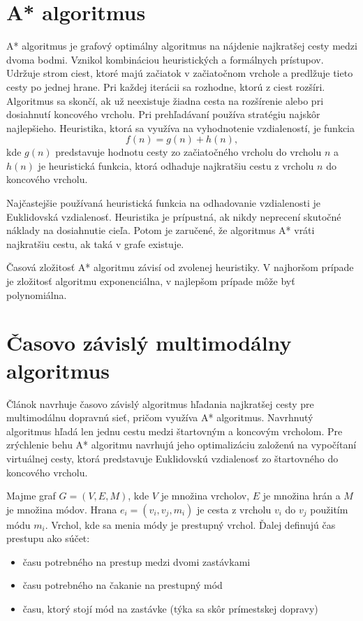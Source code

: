 \section{A* algoritmus}
A* algoritmus je grafový optimálny algoritmus na nájdenie najkratšej cesty medzi dvoma bodmi. Vznikol kombináciou heuristických a formálnych prístupov. Udržuje strom ciest, ktoré majú začiatok v začiatočnom vrchole a predlžuje tieto cesty po jednej hrane. Pri každej iterácii sa rozhodne, ktorú z ciest rozšíri. Algoritmus sa skončí, ak už neexistuje žiadna cesta na rozšírenie alebo pri dosiahnutí koncového vrcholu. Pri prehľadávaní používa stratégiu najskôr najlepšieho. Heuristika, ktorá sa využíva na vyhodnotenie vzdialeností, je funkcia
\begin{equation}
f(n) = g(n) + h(n), 
\end{equation}
kde $g(n)$ predstavuje hodnotu cesty zo začiatočného vrcholu do vrcholu $n$ a $h(n)$ je heuristická funkcia, ktorá odhaduje najkratšiu cestu z vrcholu $n$ do koncového vrcholu.

Najčastejšie používaná heuristická funkcia na odhadovanie vzdialenosti je Euklidovská vzdialenosť.
Heuristika je prípustná, ak nikdy neprecení skutočné náklady na dosiahnutie cieľa. Potom je zaručené, že algoritmus A* vráti najkratšiu cestu, ak taká v grafe existuje.

Časová zložitosť A* algoritmu závisí od zvolenej heuristiky. V najhoršom prípade je zložitosť algoritmu exponenciálna, v najlepšom prípade môže byť polynomiálna.

\section{Časovo závislý multimodálny algoritmus}

Článok \cite{timedependent} navrhuje časovo závislý algoritmus hľadania najkratšej cesty pre multimodálnu dopravnú sieť, pričom využíva A* algoritmus. Navrhnutý algoritmus hľadá len jednu cestu medzi štartovným a koncovým vrcholom. Pre zrýchlenie behu A* algoritmu navrhujú jeho optimalizáciu založenú na vypočítaní virtuálnej cesty, ktorá predstavuje Euklidovskú vzdialenosť zo štartovného do koncového vrcholu. 

Majme graf $G = (V, E, M)$, kde $V$ je množina vrcholov, $E$ je množina hrán a $M$ je množina módov. Hrana $e_i = (v_i, v_j, m_i)$ je cesta z vrcholu $v_i$ do $v_j$ použitím módu $m_i$. Vrchol, kde sa menia módy je prestupný vrchol. Ďalej definujú čas prestupu ako súčet:
\begin{itemize}
\item{času potrebného na prestup medzi dvomi zastávkami}
\item{času potrebného na čakanie na prestupný mód}
\item{času, ktorý stojí mód na zastávke (týka sa skôr prímestskej dopravy)}
\end{itemize}

